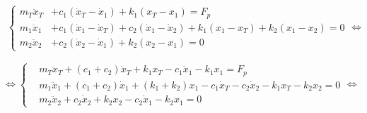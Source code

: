 \begin{align}\label{eq_2dof_system}
    \left\{
    \begin{aligned}
        m_T \ddot{x}_T &+ c_1 (\dot{x}_T - \dot{x}_1) + k_1 (x_T - x_1) = F_p \\
        m_1 \ddot{x}_1 &+ c_1 (\dot{x}_1 - \dot{x}_T) + c_2 (\dot{x}_1 - \dot{x}_2) + k_1 (x_1 - x_T) + k_2 (x_1 - x_2) = 0 \\
        m_2 \ddot{x}_2 &+ c_2 (\dot{x}_2 - \dot{x}_1) + k_2 (x_2 - x_1) = 0
    \end{aligned}
    \right. 
    \Longleftrightarrow
    \end{align}
    
    \vspace{5mm}
    
    \begin{equation*} 
    \Longleftrightarrow
    \left\{
    \begin{aligned}
        &m_T \ddot{x}_T + (c_1 + c_2) \dot{x}_T + k_1 x_T - c_1 \dot{x}_1 - k_1 x_1 = F_p \\
        &m_1 \ddot{x}_1 + (c_1 + c_2) \dot{x}_1 + (k_1 + k_2) x_1 - c_1 \dot{x}_T - c_2 \dot{x}_2 - k_1 x_T - k_2 x_2 = 0 \\
        &m_2 \ddot{x}_2 + c_2 \dot{x}_2 + k_2 x_2 - c_2 \dot{x}_1 - k_2 x_1 = 0
    \end{aligned}
    \right.
    \Longleftrightarrow
    \end{equation*}
    
    \vspace{5mm}
    
